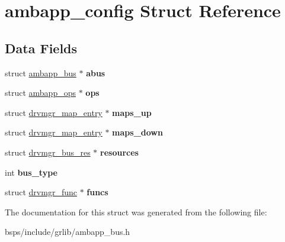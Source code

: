 \hypertarget{structambapp__config}{}\section{ambapp\+\_\+config Struct Reference}
\label{structambapp__config}
\subsection*{Data Fields}
\begin{DoxyCompactItemize}
\item 
\mbox{\label{structambapp__config_a1d187b7b087db706a971403d0d10253e}} 
struct \mbox{\hyperlink{structambapp__bus}{ambapp\+\_\+bus}} $\ast$ {\bfseries abus}
\item 
\mbox{\label{structambapp__config_a9f4c02dc95f72abe7ee3c646f0526e69}} 
struct \mbox{\hyperlink{structambapp__ops}{ambapp\+\_\+ops}} $\ast$ {\bfseries ops}
\item 
\mbox{\label{structambapp__config_a7cd080705628a19ec146be75d877caff}} 
struct \mbox{\hyperlink{structdrvmgr__map__entry}{drvmgr\+\_\+map\+\_\+entry}} $\ast$ {\bfseries maps\+\_\+up}
\item 
\mbox{\label{structambapp__config_a99f8786abfdd69b7b66a3c0500ca733d}} 
struct \mbox{\hyperlink{structdrvmgr__map__entry}{drvmgr\+\_\+map\+\_\+entry}} $\ast$ {\bfseries maps\+\_\+down}
\item 
\mbox{\label{structambapp__config_a9ea977c96ae92cf68a80b52c22805d18}} 
struct \mbox{\hyperlink{structdrvmgr__bus__res}{drvmgr\+\_\+bus\+\_\+res}} $\ast$ {\bfseries resources}
\item 
\mbox{\label{structambapp__config_abdffe345b325f2fbd548c56893c053ce}} 
int {\bfseries bus\+\_\+type}
\item 
\mbox{\label{structambapp__config_a2972d3d46b90b78c8b5ecbc9314a636e}} 
struct \mbox{\hyperlink{structdrvmgr__func}{drvmgr\+\_\+func}} $\ast$ {\bfseries funcs}
\end{DoxyCompactItemize}


The documentation for this struct was generated from the following file\+:\begin{DoxyCompactItemize}
\item 
bsps/include/grlib/ambapp\+\_\+bus.\+h\end{DoxyCompactItemize}
